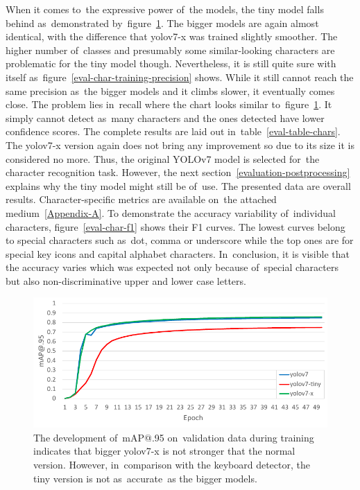When it comes to~the expressive power of~the models, the tiny model falls behind as~demonstrated by~figure~\ref{eval-char-training}. The bigger models are again almost identical, with the difference that yolov7-x was trained slightly smoother. The higher number of~classes and presumably some similar-looking characters are problematic for the tiny model though. Nevertheless, it is still quite sure with itself as~figure~\ref{eval-char-training-precision} shows. While it still cannot reach the same precision as~the bigger models and it climbs slower, it eventually comes close. The problem lies in~recall where the chart looks similar to~figure~\ref{eval-char-training}. It simply cannot detect as~many characters and the ones detected have lower confidence scores. The complete results are laid out in~table~\ref{eval-table-chars}. The yolov7-x version again does not bring any improvement so due to its size it is considered no more. Thus, the original YOLOv7 model is selected for~the character recognition task. However, the next section~\ref{evaluation-postprocessing} explains why the tiny model might still be of~use. The presented data are overall results. Character-specific metrics are available on~the attached medium~\ref{Appendix-A}. To demonstrate the accuracy variability of~individual characters, figure~\ref{eval-char-f1} shows their F1 curves. The lowest curves belong to special characters such as~dot, comma or underscore while the top ones are for special key icons and capital alphabet characters. In~conclusion, it is visible that the accuracy varies which was expected not only because of~special characters but also non-discriminative upper and lower case letters.

\begin{figure}[hbt]
    \includegraphics[width=1\textwidth]{img/evaluation/eval-char-training.pdf}
    \caption{The development of~mAP@.95 on~validation data during training indicates that bigger yolov7-x is not stronger that the normal version. However, in~comparison with the keyboard detector, the tiny version is not as~accurate~as the bigger models.}
    \label{eval-char-training}
\end{figure}

